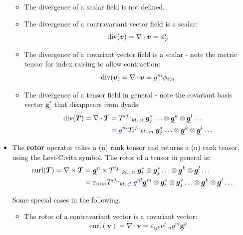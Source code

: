 \documentclass{digitaldynamics}
\def\vect#1{\bm{#1}}
\def\vcovar#1{{\bm{#1}}^*}
\def\vcontr#1{\underline{\bm{#1}}}
\def\tensor#1{\bm{#1}}
\begin{document}
\begin{itemize}
	\begin{itemize}
		\item The divergence of a scalar field is not defined.
	
		\item The divergence of a contravariant vector field is a scalar: 
		\[
				 \mathrm{div}(\vect{v}) = \nabla \cdot \vect{v} = \phi^i_{\textcolor{blue}{;i}}
		\]
		
		\item The divergence of a covariant vector field is a scalar - note the metric tensor for index raising to allow contraction: 
		\[
				 \mathrm{div}(\vect{v}) = \nabla \cdot \vect{v} = \textcolor{blue}{g^{ni}} \phi_i{}_{\textcolor{blue}{;n}} 
		\]
		
		\item The divergence of a tensor field in general - note the covariant basis vector $\vcovar{g}_i$ that disappears from dyads:
		\begin{align}
					\mathrm{div}(\tensor{T}) = \nabla \cdot \tensor{T}  
					&= T^{ij..}{}_{kl.. \textcolor{blue}{;i}} \; \vcovar{g}_j \ldots \otimes \vcontr{g}^k \otimes \vcontr{g}^l \ldots \\
					&= \textcolor{blue}{g^{ni}} T_i{}^{j..}{}_{kl.. \textcolor{blue}{;n}} \; \vcovar{g}_j \ldots \otimes \vcontr{g}^k \otimes \vcontr{g}^l \ldots
		\end{align}
	\end{itemize}
	
	
	
	\item The \textbf{rotor} operator takes a (n) rank tensor and returns a (n) rank tensor, 
	using the Levi-Civita symbol.
	The rotor of a tensor in general is:
		\begin{align}
					\mathrm{curl}(\tensor{T}) = \nabla \times \tensor{T}  
					&= \vcontr{g}^n \times T^{ij..}{}_{kl.. \textcolor{blue}{;n}} \; \vcovar{g}_i \otimes \vcovar{g}_j \ldots \otimes \vcontr{g}^k \otimes \vcontr{g}^l \ldots \\
					&= \textcolor{blue}{\varepsilon_{n i m}} T^{ij..}{}_{kl.. \textcolor{blue}{;l}} \; \textcolor{blue}{g^{nl}} \vcontr{g}^m \otimes \vcovar{g}_i \otimes \vcovar{g}_j \ldots \otimes \vcontr{g}^k \otimes \vcontr{g}^l \ldots
		\end{align}
	
	Some special cases in the following.
	
	\begin{itemize}
		\item The rotor of a contravariant vector is a covariant vector: 
		\[
				 \mathrm{curl}(\vect{v}) = \nabla \cdot \vect{v}
				   = \varepsilon_{ijk} v^j{}_{;n} g^{ni} \vcontr{g}^k
		\]
		

\end{itemize}
\end{itemize}
\end{document}
